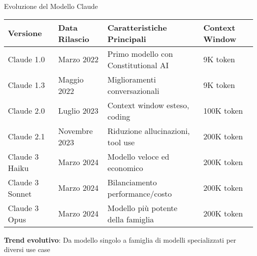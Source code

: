 \documentclass[aspectratio=169]{beamer}
\begin{document}
%
%
\begin{frame}{Evoluzione del Modello Claude}
\begin{table}[h]
\centering
\small
\begin{tabular}{|l|l|l|l|}
\hline
\textbf{Versione} & \textbf{Data Rilascio} & \textbf{Caratteristiche Principali} & \textbf{Context Window} \\
\hline
Claude 1.0 & Marzo 2022 & Primo modello con Constitutional AI & 9K token \\
\hline
Claude 1.3 & Maggio 2022 & Miglioramenti conversazionali & 9K token \\
\hline
Claude 2.0 & Luglio 2023 & Context window esteso, coding & 100K token \\
\hline
Claude 2.1 & Novembre 2023 & Riduzione allucinazioni, tool use & 200K token \\
\hline
Claude 3 Haiku & Marzo 2024 & Modello veloce ed economico & 200K token \\
\hline
Claude 3 Sonnet & Marzo 2024 & Bilanciamento performance/costo & 200K token \\
\hline
Claude 3 Opus & Marzo 2024 & Modello più potente della famiglia & 200K token \\
\hline
\end{tabular}
\end{table}

\textbf{Trend evolutivo}: Da modello singolo a famiglia di modelli specializzati per diversi use case
\end{frame}
%
%
\end{document}
